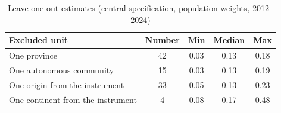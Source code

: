 \begin{table}[!htbp]\centering\small
\caption{Leave-one-out estimates (central specification, population weights, 2012--2024)}\label{tab:loo}
\begin{tabular}{lcccc}\toprule
Excluded unit & Number & Min & Median & Max\\\midrule
One province & 42 & 0.03 & 0.13 & 0.18\\
One autonomous community & 15 & 0.03 & 0.13 & 0.19\\
One origin from the instrument & 33 & 0.05 & 0.13 & 0.23\\
One continent from the instrument & 4 & 0.08 & 0.17 & 0.48\\
\bottomrule\end{tabular}
\end{table}